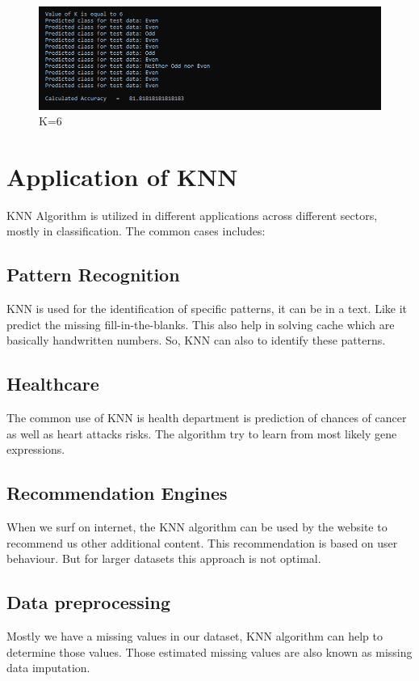 \documentclass[conference]{IEEEtran}
\begin{document}
\begin{figure}
    \centering
    \includegraphics[width=1.0\linewidth]{K=6.PNG}
    \caption{K=6}
    \label{fig:enter-label}
\end{figure}



\section{Application of KNN}
KNN Algorithm is utilized in different applications across different sectors, mostly in classification. The common cases includes:


\subsection{Pattern Recognition}
KNN is used for the identification of specific patterns, it can be in a text. Like it predict the missing fill-in-the-blanks. This also help in solving cache which are basically handwritten numbers. So, KNN can also
to identify these patterns.


\subsection{Healthcare}
The common use of KNN is health department is prediction of chances of cancer as well as heart attacks risks. The algorithm try to learn from most likely gene expressions. 

\subsection{Recommendation Engines}
When we surf on internet, the KNN algorithm can be used by the website to recommend us other additional content. This recommendation is based on user behaviour. But for larger datasets this approach is not optimal. 

\subsection{Data preprocessing}
Mostly we have a missing values in our dataset, KNN algorithm can help to determine those values. Those estimated missing values are also known as missing data imputation. 
\end{document}
